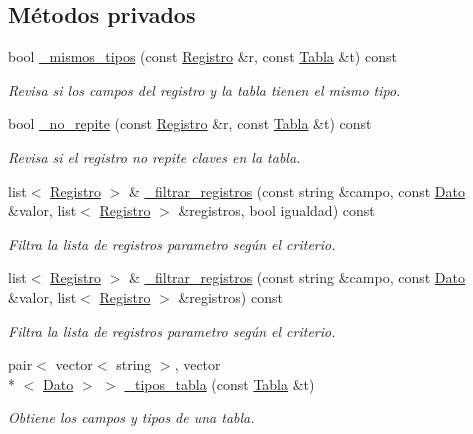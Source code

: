 \subsection*{Métodos privados}
{\bf }\par
\begin{DoxyCompactItemize}
\item 
bool \hyperlink{classBaseDeDatos_adf046a8fde5505668174122997ebb147}{\+\_\+mismos\+\_\+tipos} (const \hyperlink{classRegistro}{Registro} \&r, const \hyperlink{classTabla}{Tabla} \&t) const 
\begin{DoxyCompactList}\small\item\em Revisa si los campos del registro y la tabla tienen el mismo tipo. \end{DoxyCompactList}\item 
bool \hyperlink{classBaseDeDatos_a64ea8616111fb54b0804fe7560668ff6}{\+\_\+no\+\_\+repite} (const \hyperlink{classRegistro}{Registro} \&r, const \hyperlink{classTabla}{Tabla} \&t) const 
\begin{DoxyCompactList}\small\item\em Revisa si el registro no repite claves en la tabla. \end{DoxyCompactList}\item 
list$<$ \hyperlink{classRegistro}{Registro} $>$ \& \hyperlink{classBaseDeDatos_a14edefd67e0fca7c3f7f2e965424916a}{\+\_\+filtrar\+\_\+registros} (const string \&campo, const \hyperlink{classDato}{Dato} \&valor, list$<$ \hyperlink{classRegistro}{Registro} $>$ \&registros, bool igualdad) const 
\begin{DoxyCompactList}\small\item\em Filtra la lista de registros parametro según el criterio. \end{DoxyCompactList}\item 
list$<$ \hyperlink{classRegistro}{Registro} $>$ \& \hyperlink{classBaseDeDatos_ab64f6c5aed35a029620da579853733ba}{\+\_\+filtrar\+\_\+registros} (const string \&campo, const \hyperlink{classDato}{Dato} \&valor, list$<$ \hyperlink{classRegistro}{Registro} $>$ \&registros) const 
\begin{DoxyCompactList}\small\item\em Filtra la lista de registros parametro según el criterio. \end{DoxyCompactList}\item 
pair$<$ vector$<$ string $>$, vector\\*
$<$ \hyperlink{classDato}{Dato} $>$ $>$ \hyperlink{classBaseDeDatos_ad5b99bf20095789ca5636bf0593ad8a5}{\+\_\+tipos\+\_\+tabla} (const \hyperlink{classTabla}{Tabla} \&t)
\begin{DoxyCompactList}\small\item\em Obtiene los campos y tipos de una tabla. \end{DoxyCompactList}\end{DoxyCompactItemize}

